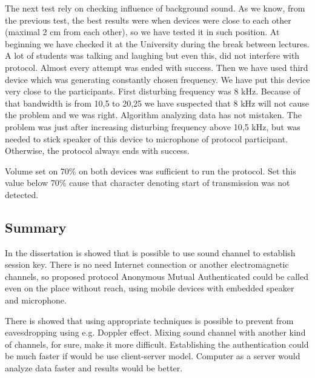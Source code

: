 \documentclass[11pt,titlepage]{article}
\theoremstyle{plain}
\begin{document}
\vspace{5mm}

The next test rely on checking influence of background sound. As we know, from the previous test, the best results were when devices were close to each other (maximal 2 cm from each other), so we have tested it in such position. At beginning we have checked it at the University during the break between lectures. A lot of students was talking and laughing but even this, did not interfere with protocol. Almost every attempt was ended with success. Then we have used third device which was generating constantly chosen frequency. We have put this device very close to the participants. First disturbing frequency was 8 kHz. Because of that bandwidth is from 10,5 to 20,25 we have suspected that 8 kHz will not cause the problem and we was right. Algorithm analyzing data has not mistaken. The problem was just after increasing disturbing frequency above 10,5 kHz, but was needed to stick speaker of this device to microphone of protocol participant. Otherwise, the protocol always ends with success. 

\vspace{5mm}

Volume set on 70\% on both devices was sufficient to run the protocol. Set this value below 70\% cause that character denoting start of transmission was not detected.



\subsection{Summary}

In the dissertation is showed that is possible to use sound channel to establish session key. There is no need Internet connection or another electromagnetic channels, so proposed protocol Anonymous Mutual Authenticated could be called even on the place without reach, using mobile devices with embedded speaker and microphone. 

\vspace{5mm}

There is showed that using appropriate techniques is possible to prevent from eavesdropping using e.g. Doppler effect. Mixing sound channel with another kind of channels, for sure, make it more difficult. Establishing the authentication could be much faster if would be use client-server model. Computer as a server would analyze data faster and results would be better.






\end{document}
